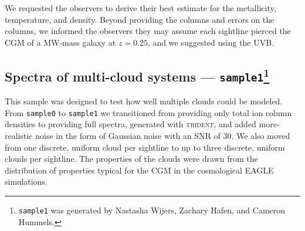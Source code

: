 \documentclass[fleqn,usenatbib]{mnras}
\begin{document}
We requested the observers to derive their best estimate for the metallicity, temperature, and density.
Beyond providing the columns and errors on the columns, we informed the observers they may assume each sightline pierced the CGM of a MW-mass galaxy at $z=0.25$, and we suggested using the \cite{Haardt2012} UVB.

\subsection[Spectra of multi-cloud systems --- \texttt{sample1}]{Spectra of multi-cloud systems --- \texttt{sample1}\footnote{
\texttt{sample1} was generated by Nastasha Wijers, Zachary Hafen, and Cameron Hummels.
}}
\label{s: data generation -- sample1}

This sample was designed to test how well multiple clouds could be modeled.
From \texttt{sample0} to \texttt{sample1} we transitioned from providing only total ion column densities to providing full spectra, generated with \textsc{trident}, and added more-realistic noise in the form of Gaussian noise with an SNR of 30.
We also moved from one discrete, uniform cloud per sightline to up to three discrete, uniform clouds per sightline.
The properties of the clouds were drawn from the distribution of properties typical for the CGM in the cosmological \textsc{EAGLE} simulations.
\end{document}
